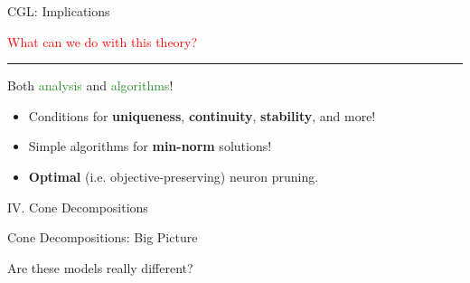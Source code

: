 \documentclass[usenames,dvipsnames,mathserif,notheorems]{beamer}
\newcommand{\horizontalrule}{
	{
			\vspace{-0.5em}
			\center \rule{\textwidth}{0.1em}
			\vspace{-0.2em}
		}
}
\newcommand{\red}[1]{\textcolor{Red}{#1}}
\newcommand{\green}[1]{\textcolor{ForestGreen}{#1}}
\begin{document}
\begin{frame}{CGL: Implications}
	\begin{center}
		\Large
		\red{What can we do with this theory?}
	\end{center}

	\pause
	\horizontalrule

	\begin{center}
		\Large Both \green{analysis} and \green{algorithms}!
	\end{center}

	\pause
	\begin{itemize}
		\large
		\item Conditions for \textbf{uniqueness},
		      \textbf{continuity}, \textbf{stability}, and more!

		      \pause
		      \vspace{1ex}
		\item Simple algorithms for \textbf{min-norm} solutions!
		      \pause
		      \vspace{1ex}

		\item \textbf{Optimal} (i.e. objective-preserving) neuron pruning.
	\end{itemize}

\end{frame}


\begin{frame}{}
	\begin{center}
		\huge IV. Cone Decompositions
	\end{center}
\end{frame}

\begin{frame}{Cone Decompositions: Big Picture}
	\begin{center}
		\Large Are these models really different?
	\end{center}

	\begin{figure}[]
		\centering
		
	\end{figure}
\end{frame}
\end{document}
